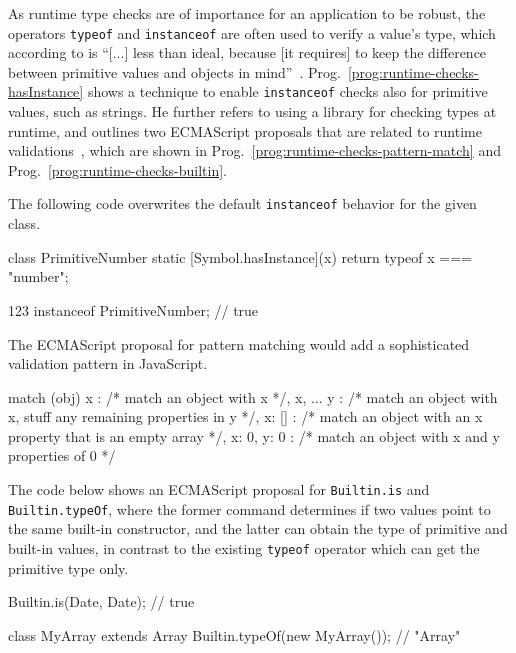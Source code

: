 \noindent
As runtime type checks are of importance for an application to be robust, the operators \texttt{typeof} and \texttt{instanceof} are often used to verify a value's type, which according to \citeauthor{DynamicTypeChecks:Rauschmayer:2017} is ``[...] less than ideal, because [it requires] to keep the difference between primitive values and objects in mind''~\cite{DynamicTypeChecks:Rauschmayer:2017}. Prog.~\ref{prog:runtime-checks-hasInstance} shows a technique to enable \texttt{instanceof} checks also for primitive values, such as strings. He further refers to using a library for checking types at runtime, and outlines two ECMAScript proposals that are related to runtime validations~\cite{DynamicTypeChecks:Rauschmayer:2017}, which are shown in Prog.~\ref{prog:runtime-checks-pattern-match} and Prog.~\ref{prog:runtime-checks-builtin}.

\begin{program}[t]
\caption{The following code overwrites the default \texttt{instanceof} behavior for the given class.~\cites{DynamicTypeChecks:Rauschmayer:2017, DynamicTypeChecks:hasInstance}}
\label{prog:runtime-checks-hasInstance}
\begin{JsCode}
class PrimitiveNumber {
  static [Symbol.hasInstance](x) {
    return typeof x === "number";
  }
}

123 instanceof PrimitiveNumber; // true
\end{JsCode}
\end{program}
\begin{program}[t]
\caption{The ECMAScript proposal for pattern matching\protect\footnotemark{} would add a sophisticated validation pattern in JavaScript.~\cites{DynamicTypeChecks:Rauschmayer:2017, PatternMatchingProposalRepo}}
\label{prog:runtime-checks-pattern-match}
\begin{JsCode}
match (obj) {
  { x }: /* match an object with x */,
  { x, ... y }: /* match an object with x, stuff any remaining properties in y */,
  { x: [] }: /* match an object with an x property that is an empty array */,
  { x: 0, y: 0 }: /* match an object with x and y properties of 0 */
}
\end{JsCode}
\end{program}
\begin{program}[t]
\caption{The code below shows an ECMAScript proposal for \texttt{Builtin.is} and \texttt{Builtin.typeOf}\protect\footnotemark{}, where the former command determines if two values point to the same built-in constructor, and the latter can obtain the type of primitive and built-in values, in contrast to the existing \texttt{typeof} operator which can get the primitive type only.~\cites{DynamicTypeChecks:Rauschmayer:2017, BuiltinProposalRepo}}
\label{prog:runtime-checks-builtin}
\begin{JsCode}
Builtin.is(Date, Date); // true

class MyArray extends Array { }
Builtin.typeOf(new MyArray()); // "Array"
\end{JsCode}
\end{program}

